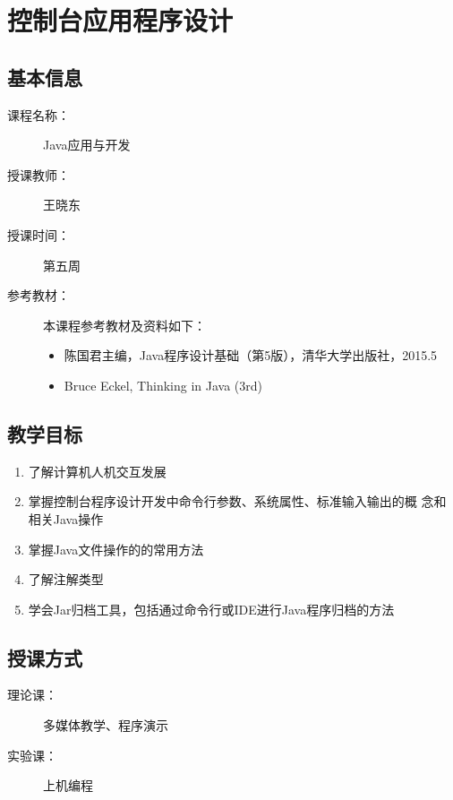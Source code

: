 \chapter{控制台应用程序设计}
\label{chp:Terminal-application-programming}

\section*{基本信息}
\sline
\begin{description}
\item[课程名称：] Java应用与开发
\item[授课教师：] 王晓东
\item[授课时间：] 第五周
\item[参考教材：] 本课程参考教材及资料如下：
  \begin{itemize}
  \item 陈国君主编，Java程序设计基础（第5版），清华大学出版社，2015.5
  \item Bruce Eckel, Thinking in Java (3rd)
  \end{itemize}
\end{description}

\section*{教学目标}

\sline

\begin{enumerate}
\item 了解计算机人机交互发展
\item 掌握控制台程序设计开发中命令行参数、系统属性、标准输入输出的概
  念和相关Java操作
\item 掌握Java文件操作的的常用方法
\item 了解注解类型
\item 学会Jar归档工具，包括通过命令行或IDE进行Java程序归档的方法
\end{enumerate}

\section*{授课方式}

\sline
\begin{description}
\item[理论课：] 多媒体教学、程序演示
\item[实验课：] 上机编程
\end{description}

